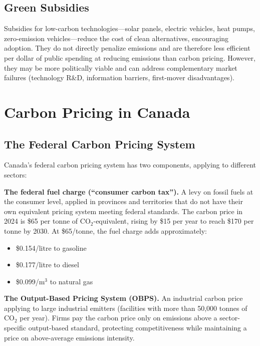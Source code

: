 \subsection{Green Subsidies}

Subsidies for low-carbon technologies---solar panels, electric vehicles, heat pumps, zero-emission vehicles---reduce the cost of clean alternatives, encouraging adoption. They do not directly penalize emissions and are therefore less efficient per dollar of public spending at reducing emissions than carbon pricing. However, they may be more politically viable and can address complementary market failures (technology R\&D, information barriers, first-mover disadvantages).

\section{Carbon Pricing in Canada}

\subsection{The Federal Carbon Pricing System}

Canada's federal carbon pricing system has two components, applying to different sectors:

\textbf{The federal fuel charge (``consumer carbon tax'').} A levy on fossil fuels at the consumer level, applied in provinces and territories that do not have their own equivalent pricing system meeting federal standards. The carbon price in 2024 is \$65 per tonne of CO$_2$-equivalent, rising by \$15 per year to reach \$170 per tonne by 2030. At \$65/tonne, the fuel charge adds approximately:
\begin{itemize}
  \item \$0.154/litre to gasoline
  \item \$0.177/litre to diesel
  \item \$0.099/m$^3$ to natural gas
\end{itemize}

\textbf{The Output-Based Pricing System (OBPS).} An industrial carbon price applying to large industrial emitters (facilities with more than 50,000 tonnes of CO$_2$ per year). Firms pay the carbon price only on emissions above a sector-specific output-based standard, protecting competitiveness while maintaining a price on above-average emissions intensity.

